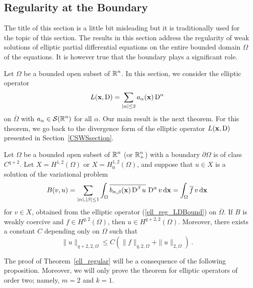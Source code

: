 \subsection{Regularity at the Boundary} \label{ell_sect_RB}

The title of this section is a little bit misleading but it is
traditionally used for the topic of this section.
The results in this section address the regularity of weak solutions
of elliptic partial differential equations on the entire bounded
domain $\Omega$ of the equations.  It is however true that the
boundary plays a significant role.

Let $\Omega$ be a bounded open subset of $\displaystyle \mathbb{R}^n$.  In
this section, we consider the elliptic operator 
\begin{equation} \label{ell_reg_LDBound}
L(\mathbf{x},\operatorname{D}) = \sum_{|\alpha|\leq 2} a_\alpha(\mathbf{x}) \operatorname{D}^\alpha
\end{equation}
on $\overline{\Omega}$ with $\displaystyle a_\alpha \in \mathcal{S}(\mathbb{R}^n)$
for all $\alpha$.  Our main result is the next theorem.
For this theorem, we go back to the divergence form of the
elliptic operator $L(\mathbf{x},\operatorname{D})$ presented in
Section~\ref{CSWSsection}.

\begin{theorem} \label{ell_regular}
Let $\Omega$ be a bounded open subset of $\displaystyle \mathbb{R}^n$
(or $\displaystyle \mathbb{R}^n_+$)
with a boundary $\partial \Omega$ is of class $\displaystyle C^{q+2}$.  Let
$\displaystyle X = H^{1,2}(\Omega)$ or
$\displaystyle X = H^{1,2}_0(\Omega)$, and suppose that
$u\in X$ is a solution of the variational problem
\[
B(v,u) = \sum_{|\alpha|,|\beta|\leq 1}
\int_\Omega \overline{b_{\alpha,\beta}(\mathbf{x}) \operatorname{D}^\beta u}\, \operatorname{D}^\alpha v
\,\mathrm{d}{\mathbf{x}} = \int_\Omega \overline{f}\,v \,\mathrm{d}{\mathbf{x}}
\]
for $\displaystyle v \in X$,
obtained from the elliptic operator (\ref{ell_reg_LDBound}) on
$\overline{\Omega}$.  If $B$ is weakly coercive and
$\displaystyle f \in H^{q,2}(\Omega)$, then
$\displaystyle u\in H^{q+2,2}(\Omega)$.  Moreover, there exists a constant $C$
depending only on $\Omega$ such that
\begin{equation} \label{ell_norm_reg}
\|u\|_{q+2,2,\Omega} \leq C \left( \|f\|_{q,2,\Omega}
+ \|u\|_{2,\Omega} \right) \ .
\end{equation}
\end{theorem}

The proof of Theorem~\ref{ell_regular} will be a consequence of the
following proposition.  Moreover, we will only prove the theorem for
elliptic operators of order two; namely, $m=2$ and $k=1$.

